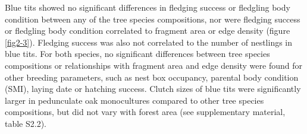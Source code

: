 \documentclass[10pt, twoside]{book} %
\begin{document}
		Blue tits showed no significant differences in fledging success or fledgling body condition between any of the tree species compositions, nor were fledging success or fledgling body condition correlated to fragment area or edge density (figure \ref{fig2-3}). Fledging success was also not correlated to the number of nestlings in blue tits. For both species, no significant differences between tree species compositions or relationships with fragment area and edge density were found for other breeding parameters, such as nest box occupancy, parental body condition (SMI), laying date or hatching success. Clutch sizes of blue tits were significantly larger in pedunculate oak monocultures compared to other tree species compositions, but did not vary with forest area (see supplementary material, table S2.2). 
		
		
		
\end{document}
